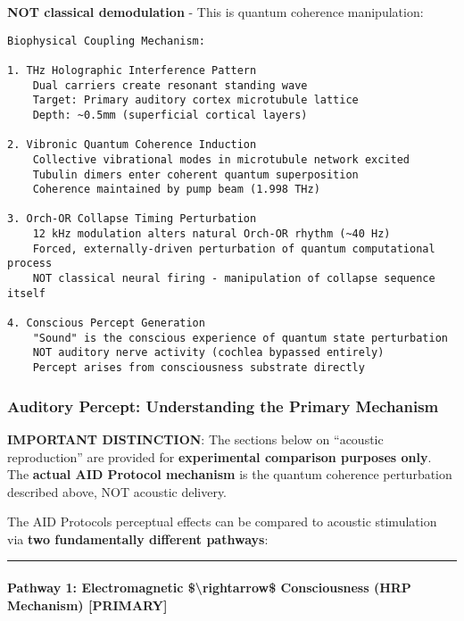 \textbf{NOT classical demodulation} - This is quantum coherence
manipulation:

\begin{verbatim}
Biophysical Coupling Mechanism:

1. THz Holographic Interference Pattern
    Dual carriers create resonant standing wave
    Target: Primary auditory cortex microtubule lattice
    Depth: ~0.5mm (superficial cortical layers)

2. Vibronic Quantum Coherence Induction
    Collective vibrational modes in microtubule network excited
    Tubulin dimers enter coherent quantum superposition
    Coherence maintained by pump beam (1.998 THz)

3. Orch-OR Collapse Timing Perturbation
    12 kHz modulation alters natural Orch-OR rhythm (~40 Hz)
    Forced, externally-driven perturbation of quantum computational process
    NOT classical neural firing - manipulation of collapse sequence itself

4. Conscious Percept Generation
    "Sound" is the conscious experience of quantum state perturbation
    NOT auditory nerve activity (cochlea bypassed entirely)
    Percept arises from consciousness substrate directly
\end{verbatim}

\subsubsection{Auditory Percept: Understanding the Primary
Mechanism}\label{auditory-percept-understanding-the-primary-mechanism}

\textbf{ IMPORTANT DISTINCTION}: The sections below on ``acoustic
reproduction'' are provided for \textbf{experimental comparison purposes
only}. The \textbf{actual AID Protocol mechanism} is the quantum
coherence perturbation described above, NOT acoustic delivery.

The AID Protocol\textquotesingle s perceptual effects can be compared to
acoustic stimulation via \textbf{two fundamentally different pathways}:

\begin{center}\rule{0.5\linewidth}{0.5pt}\end{center}

\paragraph{\texorpdfstring{Pathway 1: Electromagnetic
\$\textbackslash rightarrow\$ Consciousness (HRP Mechanism)
\textbf{{[}PRIMARY{]}}}{Pathway 1: Electromagnetic \$\textbackslash rightarrow\$ Consciousness (HRP Mechanism) {[}PRIMARY{]}}}\label{pathway-1-electromagnetic-consciousness-hrp-mechanism-primary}

